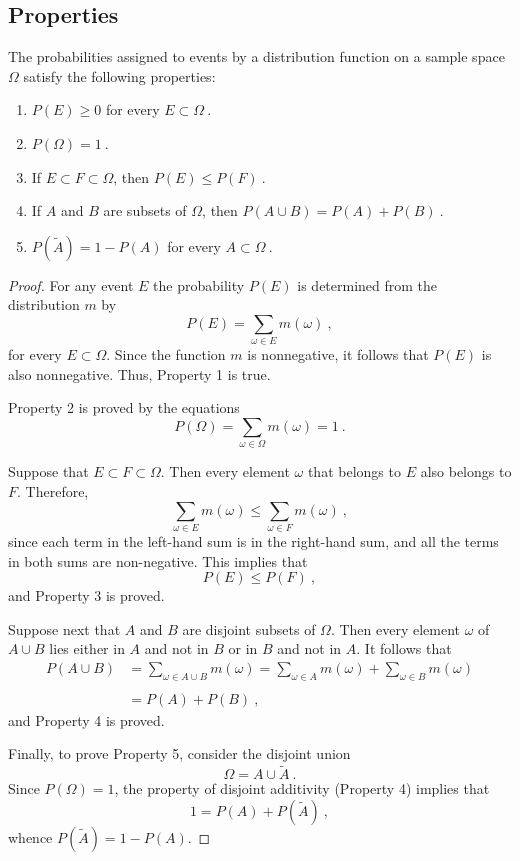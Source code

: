 

\subsection*{Properties}
\nopagebreak
\begin{theorem}\label{thm 1.1}
\leanok
The probabilities assigned to events by a distribution function on a sample space
$\Omega$ 
satisfy the following properties: 
\begin{enumerate}
\item  $P(E) \geq 0$ for every $E \subset \Omega\ $.
\item  $P(\Omega) = 1\ $.
\item  If $E \subset F \subset \Omega$, then $P(E) \leq P(F)\ $.
\item  If $A$ and $B$ are  subsets of $\Omega$, then $P(A
\cup B)
= P(A) + P(B)\ $.
\item  $P(\tilde A) = 1 - P(A)$ for every $A \subset \Omega\ $.
\end{enumerate}
\end{theorem}
\begin{proof}
\leanok
For any event $E$ the probability $P(E)$ is determined from the distribution $m$
by
$$
P(E) = \sum_{\omega \in E} m(\omega)\ ,
$$
for every $E \subset \Omega$.
Since the function $m$ is nonnegative, it follows that $P(E)$ is also
nonnegative.  Thus, Property 1 is true.  
\par
Property 2 is proved by the equations
$$
P(\Omega) = \sum_{\omega \in \Omega} m(\omega) = 1\ .
$$
\par
Suppose that $E \subset F \subset \Omega$.  Then every element $\omega$ that
belongs to $E$ also belongs to $F$.  Therefore,
$$
\sum_{\omega \in E} m(\omega) \leq \sum_{\omega \in F} m(\omega)\ ,
$$
since each term in the left-hand sum is in the right-hand sum, and all the terms 
in both sums are non-negative.  This implies that
$$P(E) \le P(F)\ ,$$
and Property 3 is proved.  
\par
Suppose next that $A$ and $B$ are disjoint subsets of
$\Omega$.  Then every element $\omega$ of $A \cup B$ lies either in $A$ and
not
in $B$ or in $B$ and not in $A$.  It follows that
$$\begin{array}{ll}
	P(A \cup B) &= \sum_{\omega \in A \cup B} m(\omega) = \sum_{\omega \in A}
	m(\omega) + \sum_{\omega \in B} m(\omega) \\
	&                             \\
	&= P(A) + P(B)\ ,
\end{array}
$$
and Property 4 is proved.  
\par
Finally, to prove Property 5, consider the disjoint union
$$
\Omega = A \cup \tilde A\ .
$$
Since $P(\Omega) = 1$, the property of disjoint additivity (Property 4) implies
that
$$
1 = P(A) + P(\tilde A)\ ,
$$
whence $P(\tilde A) = 1 - P(A)$.
\end{proof}
